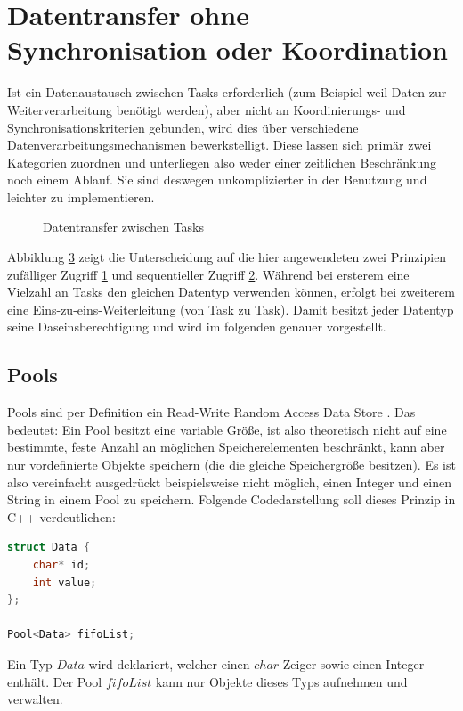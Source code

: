 \documentclass{llncs}
\begin{document}
\section{Datentransfer ohne Synchronisation oder Koordination}
Ist ein Datenaustausch zwischen Tasks erforderlich (zum Beispiel weil Daten zur Weiterverarbeitung benötigt werden), aber nicht an Koordinierungs- und Synchronisationskriterien gebunden, wird dies über verschiedene Datenverarbeitungsmechanismen bewerkstelligt. Diese lassen sich primär zwei Kategorien zuordnen und unterliegen also weder einer zeitlichen Beschränkung noch einem Ablauf. Sie sind deswegen unkomplizierter in der Benutzung und leichter zu implementieren.
\begin{figure}
	\centering
	\begin{subfigure}[b]{.450\textwidth}
		\def\svgwidth{\columnwidth}
		
		\caption{\label{subfig:zufaelliger_Zugriff}}
	\end{subfigure}
	\hspace{3em}
	\begin{subfigure}[b]{.450\textwidth}
		\def\svgwidth{\columnwidth}
		
		\caption{\label{subfig:sequentiell_Zugriff}}
	\end{subfigure}
	\caption{\label{fig:Datentransfer_Ueberblick}Datentransfer zwischen Tasks \autocite[vgl.][95]{Cooling2017}}
\end{figure}

Abbildung \ref{fig:Datentransfer_Ueberblick} zeigt die Unterscheidung auf die hier angewendeten zwei Prinzipien \glqq zufälliger Zugriff \grqq \ref{subfig:zufaelliger_Zugriff} und \glqq sequentieller Zugriff \grqq \ref{subfig:sequentiell_Zugriff}. Während bei ersterem eine Vielzahl an Tasks den gleichen Datentyp verwenden können, erfolgt bei zweiterem eine Eins-zu-eins-Weiterleitung (von Task zu Task). Damit besitzt jeder Datentyp seine Daseinsberechtigung und wird im folgenden genauer vorgestellt.
\subsection{Pools}
Pools sind per Definition ein Read-Write Random Access Data Store \autocite[vgl.][94]{Cooling2017}. Das bedeutet: Ein Pool besitzt eine variable Größe, ist also theoretisch nicht auf eine bestimmte, feste Anzahl an möglichen Speicherelementen beschränkt, kann aber nur vordefinierte Objekte speichern (die die gleiche Speichergröße besitzen). Es ist also vereinfacht ausgedrückt beispielsweise nicht möglich, einen Integer und einen String in einem Pool zu speichern. Folgende Codedarstellung soll dieses Prinzip in C++ verdeutlichen:
\begin{lstlisting}[language=C++]
struct Data {
	char* id;
	int value;
};

Pool<Data> fifoList;
\end{lstlisting}
Ein Typ $Data$ wird deklariert, welcher einen $char$-Zeiger sowie einen Integer enthält. Der Pool $fifoList$ kann nur Objekte dieses Typs aufnehmen und verwalten.
\end{document}
